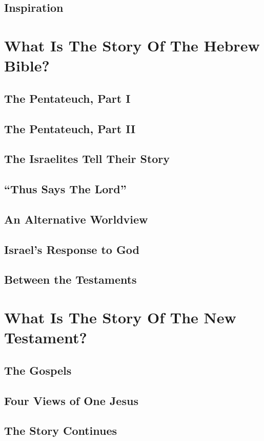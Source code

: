 \documentclass{report}
\begin{document}
    \chapter{Inspiration}

\part{What Is The Story Of The Hebrew Bible?}

    \chapter{The Pentateuch, Part I}
    \chapter{The Pentateuch, Part II}
    \chapter{The Israelites Tell Their Story}
    \chapter{``Thus Says The Lord''}
    \chapter{An Alternative Worldview}
    \chapter{Israel's Response to God}
    \chapter{Between the Testaments}

\part{What Is The Story Of The New Testament?}

    \chapter{The Gospels}
    \chapter{Four Views of One Jesus}
    \chapter{The Story Continues}
\end{document}
